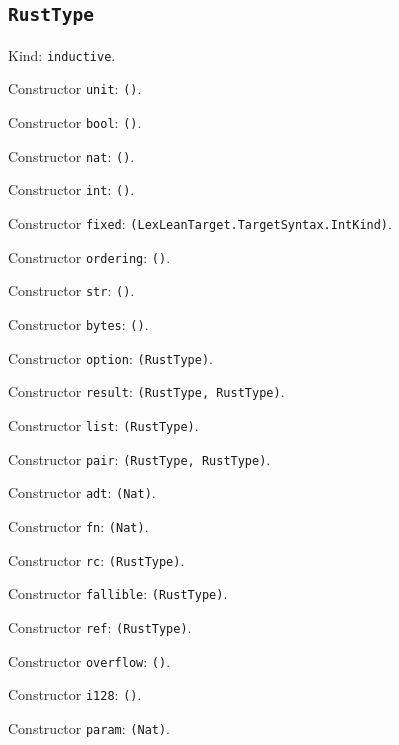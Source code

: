\documentclass[11pt]{article}
\begin{document}
\subsection*{\texttt{RustType}}
\noindent Kind: \texttt{inductive}.\par
\noindent Constructor \texttt{unit}: \texttt{()}.\par
\noindent Constructor \texttt{bool}: \texttt{()}.\par
\noindent Constructor \texttt{nat}: \texttt{()}.\par
\noindent Constructor \texttt{int}: \texttt{()}.\par
\noindent Constructor \texttt{fixed}: \texttt{(LexLeanTarget.TargetSyntax.IntKind)}.\par
\noindent Constructor \texttt{ordering}: \texttt{()}.\par
\noindent Constructor \texttt{str}: \texttt{()}.\par
\noindent Constructor \texttt{bytes}: \texttt{()}.\par
\noindent Constructor \texttt{option}: \texttt{(RustType)}.\par
\noindent Constructor \texttt{result}: \texttt{(RustType, RustType)}.\par
\noindent Constructor \texttt{list}: \texttt{(RustType)}.\par
\noindent Constructor \texttt{pair}: \texttt{(RustType, RustType)}.\par
\noindent Constructor \texttt{adt}: \texttt{(Nat)}.\par
\noindent Constructor \texttt{fn}: \texttt{(Nat)}.\par
\noindent Constructor \texttt{rc}: \texttt{(RustType)}.\par
\noindent Constructor \texttt{fallible}: \texttt{(RustType)}.\par
\noindent Constructor \texttt{ref}: \texttt{(RustType)}.\par
\noindent Constructor \texttt{overflow}: \texttt{()}.\par
\noindent Constructor \texttt{i128}: \texttt{()}.\par
\noindent Constructor \texttt{param}: \texttt{(Nat)}.\par
\end{document}
